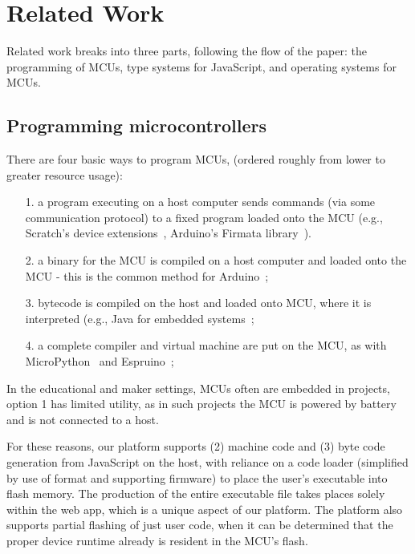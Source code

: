 \section{Related Work}
\label{sec:related}

Related work breaks into three parts, following the
flow of the paper: the programming of MCUs,
type systems for JavaScript, and operating systems
for MCUs.

\subsection{Programming microcontrollers}

There are four basic ways to program MCUs,
(ordered roughly from lower to greater resource usage):
\begin{itemize}
\item[1.] a program executing on a host computer sends commands (via some communication protocol) 
to a fixed program loaded onto the MCU (e.g., Scratch's
device extensions~\cite{ScratchCACM2009}, Arduino's Firmata library~\cite{Firmata}).
\item[2.] a binary for the MCU is compiled on a host computer and loaded onto the MCU -
this is the common method for Arduino~\cite{buildingArduino2014};
\item[3.] bytecode is compiled on the host and loaded onto MCU, where it is interpreted
(e.g., Java for embedded systems~\cite{ClausenTOPLAS};
\item[4.] a complete compiler and virtual machine are put on the MCU, 
as with MicroPython~\cite{MicroPython} and Espruino~\cite{espruinoBook};
\end{itemize}

In the educational and maker settings, MCUs often are embedded in projects,
option 1 has limited utility, as in such projects the MCU is powered by battery and
is not connected to a host.

For these reasons, our platform supports (2) machine code and (3) byte code generation 
from JavaScript on the host, with reliance on a code loader (simplified
by use of \UF format and supporting firmware) to place the user's executable 
into flash memory.  The production of the entire executable file
takes places solely within the web app, which is a unique aspect of our platform.
The platform also supports partial flashing of just user code, 
when it can be determined that the proper device runtime already 
is resident in the MCU's flash.

